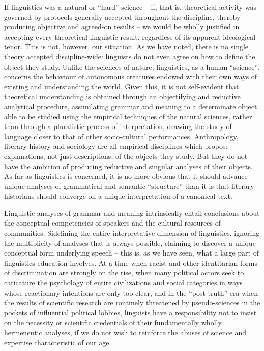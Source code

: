 \documentclass[output=paper]{langscibook}
\begin{document}
If linguistics was a natural or ``hard'' science – if, that is, theoretical activity was governed by protocols generally accepted throughout the discipline, thereby producing objective and agreed-on results – we would be wholly justified in accepting every theoretical linguistic result, regardless of its apparent ideological tenor. This is not, however, our situation. As we have noted, there is no single theory accepted discipline-wide: linguists do not even agree on how to define the object they study. Unlike the sciences of nature, linguistics, as a human ``science'', concerns the behaviour of autonomous creatures endowed with their own ways of existing and understanding the world. Given this, it is not self-evident that theoretical understanding is obtained through an objectifying and reductive analytical procedure, assimilating grammar and meaning to a determinate object able to be studied using the empirical techniques of the natural sciences, rather than through a pluralistic process of interpretation, drawing the study of language closer to that of other socio-cultural performances. Anthropology, literary history and sociology are all empirical disciplines which propose explanations, not just descriptions, of the objects they study. But they do not have the ambition of producing reductive and singular analyses of their objects. As far as linguistics is concerned, it is no more obvious that it should advance unique analyses of grammatical and semantic ``structure'' than it is that literary historians should converge on a unique interpretation of a canonical text.

Linguistic analyses of grammar and meaning intrinsically entail conclusions about the conceptual competencies of speakers and the cultural resources of communities. Sidelining the entire interpretative dimension of linguistics, ignoring the multiplicity of analyses that is always possible, claiming to discover a unique conceptual form underlying speech – this is, as we have seen, what a large part of linguistics education involves. At a time when racist and other identitarian forms of discrimination are strongly on the rise, when many political actors seek to caricature the psychology of entire civilizations and social categories in ways whose reactionary intentions are only too clear, and in the ``post-truth'' era when the results of scientific research are routinely threatened by pseudo-sciences in the pockets of influential political lobbies, linguists have a responsibility not to insist on the necessity or scientific credentials of their fundamentally wholly hermeneutic analyses, if we do not wish to reinforce the abuses of science and expertise characteristic of our age.
\end{document}
